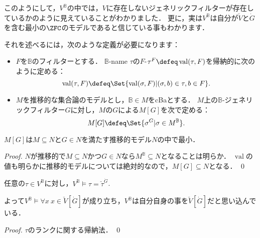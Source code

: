 \documentclass[a4j]{ltjsarticle}
\renewcommand{\emph}[1]{\textbf{\textgt{#1}}}
\DeclareMathOperator{\val}{val}
\begin{document}
このようにして，$V^{\mathbb{B}}$の中では，$V$に存在しないジェネリックフィルターが存在しているかのように見えていることがわかりました．
更に，実は$V^{\mathbb{B}}$は自分が$\check{V}$と$\dot{G}$を含む最小の$\ZFC$のモデルであると信じている事もわかります．

それを述べるには，次のような定義が必要になります：

\begin{definition}
 \begin{itemize}
  \item $F$を$\mathbb{B}$のフィルターとする．
        $\mathbb{B}$-name $\tau$の$F$-\emph{解釈}$\tau^F \defeq \val(\tau, F)$を帰納的に次のように定める：
        \[
         \val(\tau, F) \defeq \Set{ \val(\sigma, F) | (\sigma, b) \in \tau, b \in F}.
        \]
  \item $M$を推移的な集合論のモデルとし，$\mathbb{B} \in M$をcBaとする．
        $M$上の$\mathbb{B}$-ジェネリックフィルター$G$に対し，$M$の$G$による\emph{ジェネリック拡大}$M[G]$を次で定める：
        \[
         M[G] \defeq \Set{\sigma^G | \sigma \in M^{\mathbb{B}}}.
        \]
 \end{itemize}
\end{definition}

\begin{lemma}
 $M[G]$は$M \subseteq N$と$G \in N$を満たす推移的モデル$N$の中で最小．
\end{lemma}
\begin{proof}
 $N$が推移的で$M \subseteq N$かつ$G \in N$なら$M^{\mathbb{B}} \subseteq N$となることは明らか．
 $\val$の値も明らかに推移的モデルについては絶対的なので，$M[G] \subseteq N$となる． \qed
\end{proof}

\begin{theorem}
 任意の$\tau \in V^{\mathbb{B}}$に対し，$V^{\mathbb{B}} \models \tau = \check{\tau}^{\dot{G}}$.

 よって$V^{\mathbb{B}} \models \forall x \: x \in \check{V}[\dot{G}]$が成り立ち，$V^{\mathbb{B}}$は自分自身の事を$\check{V}[\dot{G}]$だと思い込んでいる．
\end{theorem}
\begin{proof}
 $\tau$のランクに関する帰納法． \qed
\end{proof}
\end{document}
